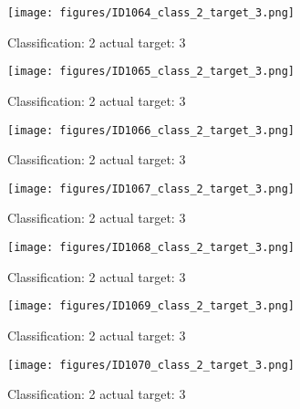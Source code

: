 \begin{figure}[h!]
\begin{center}
\texttt{[image: figures/ID1064\_class\_2\_target\_3.png]}
\end{center}
\caption{ Classification: 2 actual target: 3}
\label{fig:ID1064_class_2_target_3}
\end{figure}
\begin{figure}[h!]
\begin{center}
\texttt{[image: figures/ID1065\_class\_2\_target\_3.png]}
\end{center}
\caption{ Classification: 2 actual target: 3}
\label{fig:ID1065_class_2_target_3}
\end{figure}
\begin{figure}[h!]
\begin{center}
\texttt{[image: figures/ID1066\_class\_2\_target\_3.png]}
\end{center}
\caption{ Classification: 2 actual target: 3}
\label{fig:ID1066_class_2_target_3}
\end{figure}
\begin{figure}[h!]
\begin{center}
\texttt{[image: figures/ID1067\_class\_2\_target\_3.png]}
\end{center}
\caption{ Classification: 2 actual target: 3}
\label{fig:ID1067_class_2_target_3}
\end{figure}
\begin{figure}[h!]
\begin{center}
\texttt{[image: figures/ID1068\_class\_2\_target\_3.png]}
\end{center}
\caption{ Classification: 2 actual target: 3}
\label{fig:ID1068_class_2_target_3}
\end{figure}
\begin{figure}[h!]
\begin{center}
\texttt{[image: figures/ID1069\_class\_2\_target\_3.png]}
\end{center}
\caption{ Classification: 2 actual target: 3}
\label{fig:ID1069_class_2_target_3}
\end{figure}
\begin{figure}[h!]
\begin{center}
\texttt{[image: figures/ID1070\_class\_2\_target\_3.png]}
\end{center}
\caption{ Classification: 2 actual target: 3}
\label{fig:ID1070_class_2_target_3}
\end{figure}
